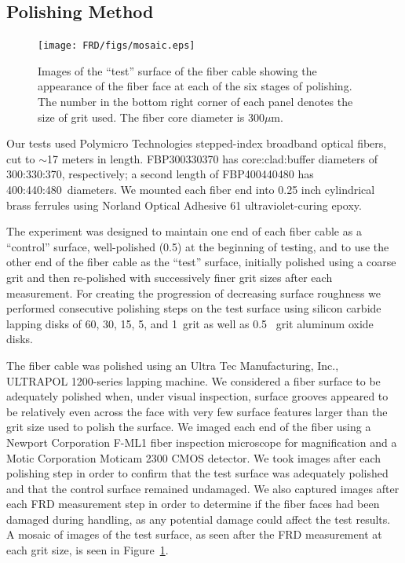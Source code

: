 \subsection{Polishing Method}
\begin{figure}[ht]
    \texttt{[image: FRD/figs/mosaic.eps]}
    \caption[Fiber face with varying degrees of polish]{\fixspacing Images of
      the ``test'' surface of the fiber cable showing the appearance of the
      fiber face at each of the six stages of polishing. The number in the
      bottom right corner of each panel denotes the size of grit used. The
      fiber core diameter is 300$\mu$m.\label{fig:mosaic}}
\end{figure}

Our tests used Polymicro Technologies stepped-index broadband optical
fibers, cut to $\sim$17 meters in length.  FBP300330370 has
core:clad:buffer diameters of 300:330:370\mum, respectively; a second
length of FBP400440480 has 400:440:480\mum\ diameters.  We mounted
each fiber end into 0.25 inch cylindrical brass ferrules using Norland
Optical Adhesive 61 ultraviolet-curing epoxy.

The experiment was designed to maintain one end of each fiber cable as
a ``control'' surface, well-polished (0.5\mum) at the beginning of
testing, and to use the other end of the fiber cable as the ``test''
surface, initially polished using a coarse grit and then re-polished
with successively finer grit sizes after each measurement.  For
creating the progression of decreasing surface roughness we performed
consecutive polishing steps on the test surface using silicon carbide
lapping disks of 60, 30, 15, 5, and 1\mum\ grit as well as 0.5
\mum\ grit aluminum oxide disks.

The fiber cable was polished using an Ultra Tec Manufacturing, Inc.,
ULTRAPOL 1200-series lapping machine.  We considered a fiber surface
to be adequately polished when, under visual inspection, surface
grooves appeared to be relatively even across the face with very few
surface features larger than the grit size used to polish the surface.
We imaged each end of the fiber using a Newport Corporation F-ML1
fiber inspection microscope for magnification and a Motic Corporation
Moticam 2300 CMOS detector.  We took images after each polishing step
in order to confirm that the test surface was adequately polished and
that the control surface remained undamaged.  We also captured images
after each FRD measurement step in order to determine if the fiber
faces had been damaged during handling, as any potential damage could
affect the test results.  A mosaic of images of the test surface, as
seen after the FRD measurement at each grit size, is seen in
Figure~\ref{fig:mosaic}.


